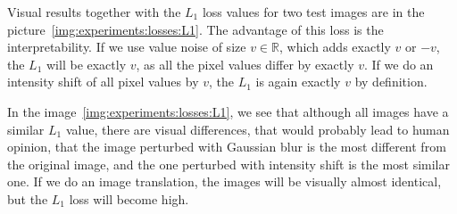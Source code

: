 Visual results together with the $L_1$ loss values for two test images are in the picture~\ref{img:experiments:losses:L1}. The advantage of this loss is the interpretability. If we use value noise of size $v \in \mathbb{R}$, which adds exactly $v$ or $-v$, the $L_1$ will be exactly $v$, as all the pixel values differ by exactly $v$. If we do an intensity shift of all pixel values by $v$, the $L_1$ is again exactly $v$ by definition.

In the image~\ref{img:experiments:losses:L1}, we see that although all images have a similar $L_1$ value, there are visual differences, that would probably lead to human opinion, that the image perturbed with Gaussian blur is the most different from the original image, and the one perturbed with intensity shift is the most similar one.
If we do an image translation, the images will be visually almost identical, but the $L_1$ loss will become high.

